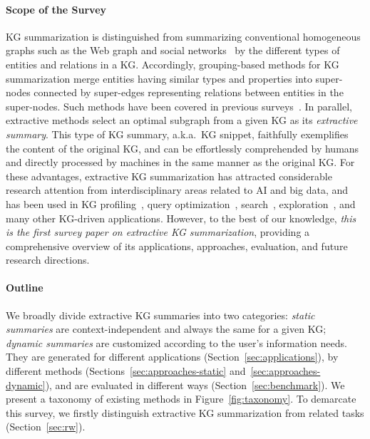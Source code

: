 \paragraph{Scope of the Survey}
KG summarization is distinguished from summarizing conventional homogeneous graphs such as the Web graph and social networks~\cite{DBLP:journals/csur/LiuSDK18} by the different types of entities and relations in a KG. Accordingly, grouping-based methods for KG summarization merge entities having similar types and properties into super-nodes connected by super-edges representing relations between entities in the super-nodes. Such methods have been covered in previous surveys~\cite{DBLP:journals/vldb/CebiricGKKMTZ19,DBLP:journals/tgdk/ScherpRBCR23}. In parallel, extractive methods select an optimal subgraph from a given KG as its \emph{extractive summary}. This type of KG summary, a.k.a.~KG snippet, faithfully exemplifies the content of the original KG, and can be effortlessly comprehended by humans and directly processed by machines in the same manner as the original KG. For these advantages, extractive KG summarization has attracted considerable research attention from interdisciplinary areas related to AI and big data, and has been used in KG profiling~\cite{DBLP:journals/semweb/EllefiBBDDST18}, query optimization~\cite{DBLP:journals/semweb/HelingA23}, search~\cite{DBLP:journals/vldb/ChapmanSKKIKG20}, exploration~\cite{DBLP:conf/cidr/LissandriniMHP22}, and many other KG-driven applications. However, to the best of our knowledge, \emph{this is the first survey paper on extractive KG summarization}, providing a comprehensive overview of its applications, approaches, evaluation, and future research directions.

\paragraph{Outline}
We broadly divide extractive KG summaries into two categories: \emph{static summaries} are context-independent and always the same for a given KG; \emph{dynamic summaries} are customized according to the user's information needs. They are generated for different applications (Section~\ref{sec:applications}), by different methods (Sections~\ref{sec:approaches-static} and~\ref{sec:approaches-dynamic}), and are evaluated in different ways (Section~\ref{sec:benchmark}). We present a taxonomy of existing methods in Figure~\ref{fig:taxonomy}. To demarcate this survey, we firstly distinguish extractive KG summarization from related tasks (Section~\ref{sec:rw}).